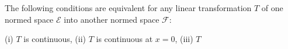 The following conditions are equivalent for any linear transformation $T$ of one normed space $\mathcal{E}$ into another normed space $\mathcal{F}$:

(i) $T$ is continuous,
(ii) $T$ is continuous at $x = 0$,
(iii) $T$
